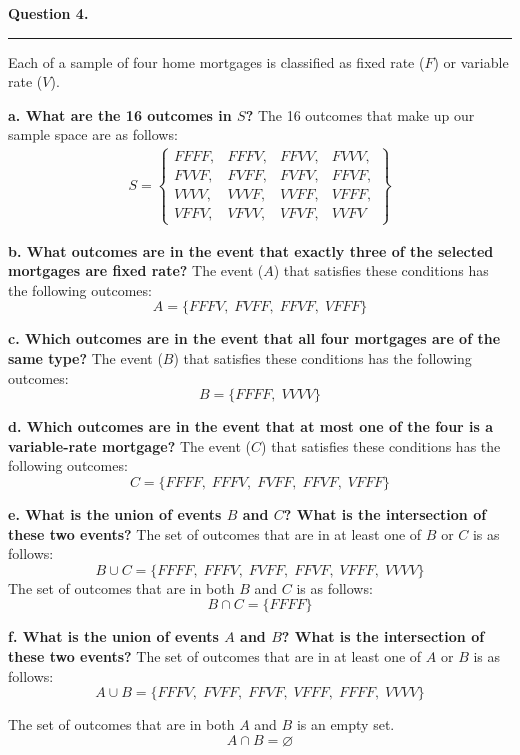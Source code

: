 \textbf{Question 4.} \newline
\hrule 

Each of a sample of four home mortgages is classified as fixed rate ($F$) or variable rate ($V$). \newline

\textbf{a. What are the 16 outcomes in $S$?} \newline
The 16 outcomes that make up our sample space are as follows: 
\begin{align*}
    S = \left\{ \begin{array}{cccc}
    FFFF, & FFFV, & FFVV, & FVVV, \\
    FVVF, & FVFF, & FVFV, & FFVF, \\
    VVVV, & VVVF, & VVFF, & VFFF, \\
    VFFV, & VFVV, & VFVF, & VVFV
    \end{array} \right\}
\end{align*} 

\textbf{b. What outcomes are in the event that exactly three of the selected mortgages are fixed rate?} \newline
The event ($A$) that satisfies these conditions has the following outcomes:
\[ A = \{ FFFV,\; FVFF,\; FFVF,\; VFFF  \}  \]

\textbf{c. Which outcomes are in the event that all four mortgages are of the same type?} \newline
The event ($B$) that satisfies these conditions has the following outcomes:
\[B = \{ FFFF,\; VVVV \}\]

\textbf{d. Which outcomes are in the event that at most one of the four is a variable-rate mortgage?} \newline
The event ($C$) that satisfies these conditions has the following outcomes:
\[C = \{ FFFF,\; FFFV,\; FVFF,\; FFVF,\; VFFF \}\]

\textbf{e. What is the union of events $B$ and $C$? What is the intersection of these two events?} \newline
The set of outcomes that are in at least one of $B$ or $C$ is as follows: 
\[B \cup C = \{ FFFF,\; FFFV,\; FVFF,\; FFVF,\; VFFF,\; VVVV\}\]
The set of outcomes that are in both $B$ and $C$ is as follows:
\[B \cap C = \{FFFF\}\]

\textbf{f. What is the union of events $A$ and $B$? What is the intersection of these two events?} \newline 
The set of outcomes that are in at least one of $A$ or $B$ is as follows:
\[A \cup B = \{ FFFV,\; FVFF,\; FFVF,\; VFFF,\; FFFF,\; VVVV\}\]

The set of outcomes that are in both $A$ and $B$ is an empty set. 
\[ A \cap B = \varnothing \]
